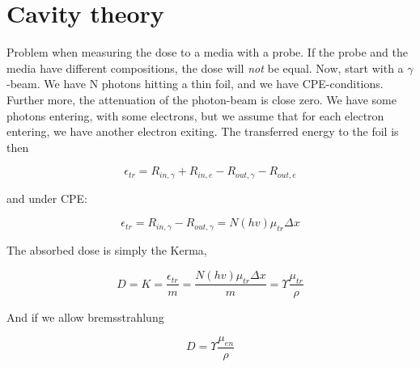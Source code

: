 \section{Cavity theory}

Problem when measuring the dose to a media with a probe.
If the probe and the media have different compositions, the dose will \emph{not} be equal.
Now, start with a $\gamma$-beam.
We have N photons hitting a thin foil, and we have CPE-conditions.
Further more, the attenuation of the photon-beam is close zero.
We have some photons entering, with some electrons, but we assume that for each electron entering, we have another electron exiting.
The transferred energy to the foil is then

\begin{equation}
    \epsilon_{tr} = R_{in,\gamma} + R_{in, e} - R_{out, \gamma} - R_{out, e}
\end{equation}

and under CPE:

\begin{equation}
    \epsilon_{tr} = R_{in, \gamma} - R_{out, \gamma} = N(hv) \mu_{tr} \Delta x
\end{equation}

The absorbed dose is simply the Kerma, 

\begin{equation}
    D = K = \frac{\epsilon_{tr}}{m} = \frac{N(hv) \mu_{tr} \Delta x}{m} = \Upsilon \frac{\mu_{tr}}{\rho}
\end{equation}

And if we allow bremsstrahlung

\begin{equation}
    D = \Upsilon \frac{\mu_{en}}{\rho}
\end{equation}
